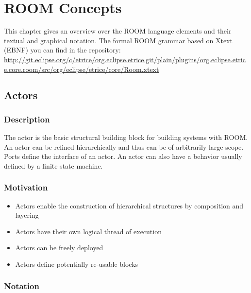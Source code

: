 \chapter{ROOM Concepts}
\label{sec:room_concepts}

This chapter gives an overview over the ROOM language elements and their textual and graphical notation.
The formal ROOM grammar based on Xtext (EBNF) you can find in the \eTrice{} repository:
\url{http://git.eclipse.org/c/etrice/org.eclipse.etrice.git/plain/plugins/org.eclipse.etrice.core.room/src/org/eclipse/etrice/core/Room.xtext}

\section{Actors}

\subsection{Description}
 
The actor is the basic structural building block for building systems with ROOM. An actor can be refined 
hierarchically and thus can be of arbitrarily large scope. Ports define the interface of an actor.
An actor can also have a behavior usually defined by a finite state machine.

\subsection{Motivation}

\begin{itemize}
\item Actors enable the construction of hierarchical structures by composition and layering
\item Actors have their own logical thread of execution
\item Actors can be freely deployed
\item Actors define potentially re-usable blocks
\end{itemize}

\subsection{Notation}

